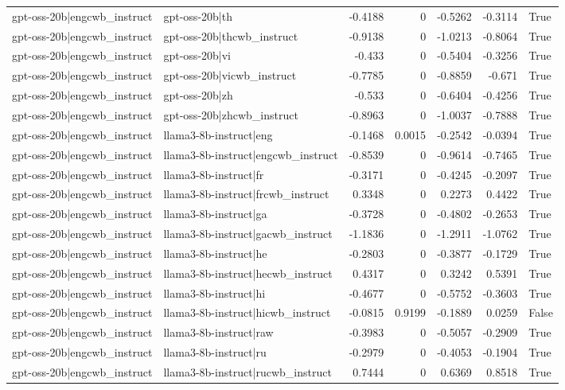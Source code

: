 \begin{table}
\begin{tabular}{l l r r r r l}
gpt-oss-20b|engcwb_instruct & gpt-oss-20b|th & -0.4188 & 0 & -0.5262 & -0.3114 & True \\
gpt-oss-20b|engcwb_instruct & gpt-oss-20b|thcwb_instruct & -0.9138 & 0 & -1.0213 & -0.8064 & True \\
gpt-oss-20b|engcwb_instruct & gpt-oss-20b|vi & -0.433 & 0 & -0.5404 & -0.3256 & True \\
gpt-oss-20b|engcwb_instruct & gpt-oss-20b|vicwb_instruct & -0.7785 & 0 & -0.8859 & -0.671 & True \\
gpt-oss-20b|engcwb_instruct & gpt-oss-20b|zh & -0.533 & 0 & -0.6404 & -0.4256 & True \\
gpt-oss-20b|engcwb_instruct & gpt-oss-20b|zhcwb_instruct & -0.8963 & 0 & -1.0037 & -0.7888 & True \\
gpt-oss-20b|engcwb_instruct & llama3-8b-instruct|eng & -0.1468 & 0.0015 & -0.2542 & -0.0394 & True \\
gpt-oss-20b|engcwb_instruct & llama3-8b-instruct|engcwb_instruct & -0.8539 & 0 & -0.9614 & -0.7465 & True \\
gpt-oss-20b|engcwb_instruct & llama3-8b-instruct|fr & -0.3171 & 0 & -0.4245 & -0.2097 & True \\
gpt-oss-20b|engcwb_instruct & llama3-8b-instruct|frcwb_instruct & 0.3348 & 0 & 0.2273 & 0.4422 & True \\
gpt-oss-20b|engcwb_instruct & llama3-8b-instruct|ga & -0.3728 & 0 & -0.4802 & -0.2653 & True \\
gpt-oss-20b|engcwb_instruct & llama3-8b-instruct|gacwb_instruct & -1.1836 & 0 & -1.2911 & -1.0762 & True \\
gpt-oss-20b|engcwb_instruct & llama3-8b-instruct|he & -0.2803 & 0 & -0.3877 & -0.1729 & True \\
gpt-oss-20b|engcwb_instruct & llama3-8b-instruct|hecwb_instruct & 0.4317 & 0 & 0.3242 & 0.5391 & True \\
gpt-oss-20b|engcwb_instruct & llama3-8b-instruct|hi & -0.4677 & 0 & -0.5752 & -0.3603 & True \\
gpt-oss-20b|engcwb_instruct & llama3-8b-instruct|hicwb_instruct & -0.0815 & 0.9199 & -0.1889 & 0.0259 & False \\
gpt-oss-20b|engcwb_instruct & llama3-8b-instruct|raw & -0.3983 & 0 & -0.5057 & -0.2909 & True \\
gpt-oss-20b|engcwb_instruct & llama3-8b-instruct|ru & -0.2979 & 0 & -0.4053 & -0.1904 & True \\
gpt-oss-20b|engcwb_instruct & llama3-8b-instruct|rucwb_instruct & 0.7444 & 0 & 0.6369 & 0.8518 & True \\

\end{tabular}
\end{table}
